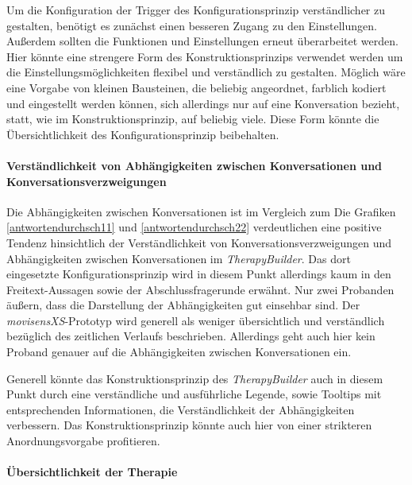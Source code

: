 Um die Konfiguration der Trigger des Konfigurationsprinzip verständlicher zu gestalten, benötigt es zunächst einen besseren Zugang zu den Einstellungen. Außerdem sollten die Funktionen und Einstellungen erneut überarbeitet werden. Hier könnte eine strengere Form des Konstruktionsprinzips verwendet werden um die Einstellungsmöglichkeiten flexibel und verständlich zu gestalten. Möglich wäre eine Vorgabe von kleinen Bausteinen, die beliebig angeordnet, farblich kodiert und eingestellt werden können, sich allerdings nur auf eine Konversation bezieht, statt, wie im Konstruktionsprinzip, auf beliebig viele. Diese Form könnte die Übersichtlichkeit des Konfigurationsprinzip beibehalten.


\paragraph{Verständlichkeit von Abhängigkeiten zwischen Konversationen und Konversationsverzweigungen}
Die Abhängigkeiten zwischen Konversationen ist im Vergleich zum 
Die Grafiken \ref{antwortendurchsch11} und \ref{antwortendurchsch22} verdeutlichen eine positive Tendenz hinsichtlich der Verständlichkeit von Konversationsverzweigungen und Abhängigkeiten zwischen Konversationen im \emph{TherapyBuilder}. Das dort eingesetzte Konfigurationsprinzip wird in diesem Punkt allerdings kaum in den Freitext-Aussagen sowie der Abschlussfragerunde erwähnt. Nur zwei Probanden äußern, dass die Darstellung der Abhängigkeiten gut einsehbar sind. Der \emph{movisensXS}-Prototyp wird generell als weniger übersichtlich und verständlich bezüglich des zeitlichen Verlaufs beschrieben. Allerdings geht auch hier kein Proband genauer auf die Abhängigkeiten zwischen Konversationen ein. 

Generell könnte das Konstruktionsprinzip des \emph{TherapyBuilder} auch in diesem Punkt durch eine verständliche und ausführliche Legende, sowie Tooltips mit entsprechenden Informationen, die Verständlichkeit der Abhängigkeiten verbessern. Das Konstruktionsprinzip könnte auch hier von einer strikteren Anordnungsvorgabe profitieren. 

\paragraph{Übersichtlichkeit der Therapie}


